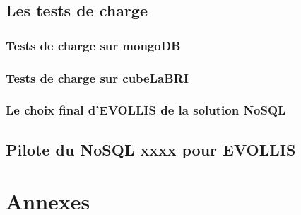 \chapter{Les tests de charge}
\section{Tests de charge sur \textsf{mongoDB}}
\section{Tests de charge sur \textsf{cubeLaBRI}}
\section{Le choix final d'\textsf{EVOLLIS} de la solution \textsf{NoSQL}}

\chapter{Pilote du \textsf{NoSQL} xxxx pour \sf  EVOLLIS}

%

\printindex




\part{Annexes}
\appendix


